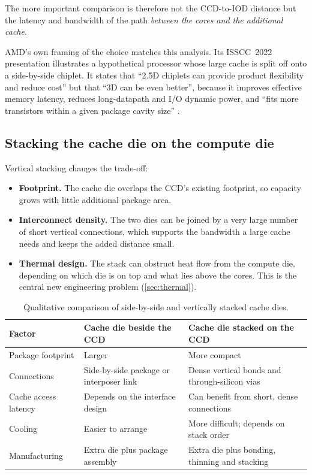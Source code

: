 The more important comparison is therefore not the CCD-to-IOD distance but the latency and bandwidth of the path \emph{between the cores and the additional cache}.

AMD's own framing of the choice matches this analysis. Its ISSCC~2022 presentation illustrates a hypothetical processor whose large cache is split off onto a side-by-side chiplet. It states that ``2.5D chiplets can provide product flexibility and reduce cost'' but that ``3D can be even better'', because it improves effective memory latency, reduces long-datapath and I/O dynamic power, and ``fits more transistors within a given package cavity size'' \cite[slide~7]{wuu2022vcache}.

\subsection{Stacking the cache die on the compute die}
Vertical stacking changes the trade-off:
\begin{itemize}
  \item \textbf{Footprint.} The cache die overlaps the CCD's existing footprint, so capacity grows with little additional package area.
  \item \textbf{Interconnect density.} The two dies can be joined by a very large number of short vertical connections, which supports the bandwidth a large cache needs and keeps the added distance small.
  \item \textbf{Thermal design.} The stack can obstruct heat flow from the compute die, depending on which die is on top and what lies above the cores. This is the central new engineering problem (\cref{sec:thermal}).
\end{itemize}

\begin{table}[htbp]
  \centering
  \caption[Qualitative comparison of side-by-side and vertically stacked cache dies]{Qualitative comparison of side-by-side and vertically stacked cache dies.}
  \label{tab:horizontal-vs-vertical}
  \small
  \begin{tabularx}{\textwidth}{@{}>{\raggedright\arraybackslash}p{3.1cm}>{\raggedright\arraybackslash}X>{\raggedright\arraybackslash}X@{}}
    \toprule
    \textbf{Factor} & \textbf{Cache die beside the CCD} & \textbf{Cache die stacked on the CCD} \\
    \midrule
    Package footprint & Larger & More compact \\
    Connections & Side-by-side package or interposer link & Dense vertical bonds and through-silicon vias \\
    Cache access latency & Depends on the interface design & Can benefit from short, dense connections \\
    Cooling & Easier to arrange & More difficult; depends on stack order \\
    Manufacturing & Extra die plus package assembly & Extra die plus bonding, thinning and stacking \\
    \bottomrule
  \end{tabularx}
\end{table}

